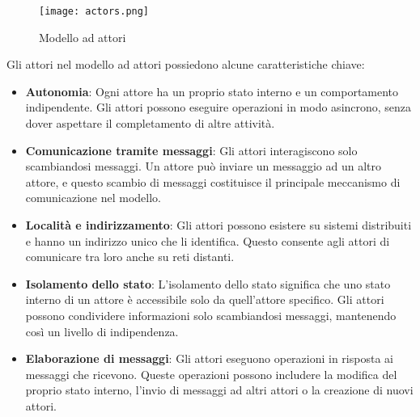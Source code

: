 \begin{figure}[H]
  \centering
  \texttt{[image: actors.png]}
  \caption[Modello ad attori]{Modello ad attori \cite{actors}}
\end{figure}

Gli attori nel modello ad attori possiedono alcune caratteristiche chiave:
\begin{itemize}
    \item \textbf{Autonomia}: Ogni attore ha un proprio stato interno e un comportamento indipendente.
    Gli attori possono eseguire operazioni in modo asincrono, senza dover aspettare il completamento di altre attività.
    \item \textbf{Comunicazione tramite messaggi}: Gli attori interagiscono solo scambiandosi messaggi.
    Un attore può inviare un messaggio ad un altro attore, e questo scambio di messaggi costituisce il principale meccanismo di comunicazione nel modello.
    \item \textbf{Località e indirizzamento}: Gli attori possono esistere su sistemi distribuiti e hanno un indirizzo unico che li identifica.
    Questo consente agli attori di comunicare tra loro anche su reti distanti.
    \item \textbf{Isolamento dello stato}: L'isolamento dello stato significa che uno stato interno di un attore è accessibile solo da quell'attore specifico.
    Gli attori possono condividere informazioni solo scambiandosi messaggi, mantenendo così un livello di indipendenza.
    \item \textbf{Elaborazione di messaggi}: Gli attori eseguono operazioni in risposta ai messaggi che ricevono.
    Queste operazioni possono includere la modifica del proprio stato interno, l'invio di messaggi ad altri attori o la creazione di nuovi attori.
\end{itemize}

